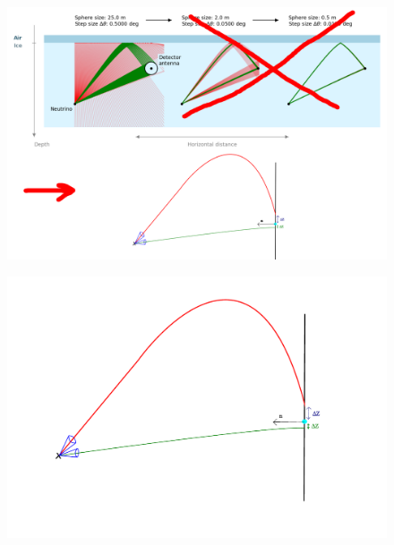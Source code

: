 \documentclass{beamer}
\begin{document}
\begin{frame}
	\begin{figure}
		\includegraphics[width=\textwidth]{figures/FullHybridIllu.png}
	\end{figure}
\end{frame}
\begin{frame}
	\begin{figure}
		\includegraphics[width=\textwidth]{figures/PrincipleHybridIllu.pdf}
	\end{figure}
\end{frame}
\end{document}
